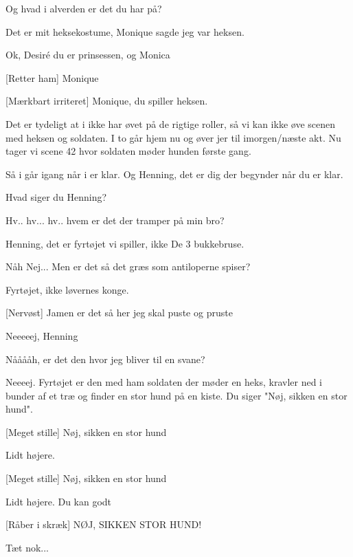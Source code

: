 \documentclass[a4paper,11pt]{article}
\begin{document}
\begin{sketch}
 Og hvad i alverden er det du har på?

 Det er mit heksekostume, Monique sagde jeg var heksen.

  Ok, Desiré du er prinsessen, og Monica

[Retter ham] Monique

[Mærkbart irriteret] Monique, du spiller heksen. 


 Det er tydeligt at i ikke har øvet på de rigtige roller, så vi kan ikke øve scenen med heksen og soldaten. I to går hjem nu og øver jer til imorgen/næste akt. Nu tager vi scene 42 hvor soldaten møder hunden første gang. 


 Så i går igang når i er klar. Og Henning, det er dig der begynder når du er klar.


 Hvad siger du Henning?

 Hv.. hv... hv.. hvem er det der tramper på min bro?

 Henning, det er fyrtøjet vi spiller, ikke De 3 bukkebruse.

 Nåh Nej... Men er det så det græs som antiloperne spiser?

 Fyrtøjet, ikke løvernes konge.

[Nervøst] Jamen er det så her jeg skal puste og pruste 

 Neeeeej, Henning

 Nååååh, er det den hvor jeg bliver til en svane?

 Neeeej. Fyrtøjet er den med ham soldaten der møder en heks, kravler ned i bunder af et træ og finder en stor hund på en kiste. Du siger "Nøj, sikken en stor hund".

[Meget stille] Nøj, sikken en stor hund

 Lidt højere.

[Meget stille] Nøj, sikken en stor hund

 Lidt højere. Du kan godt

[Råber i skræk] NØJ, SIKKEN STOR HUND!

 Tæt nok... 



\end{sketch}
\end{document}
